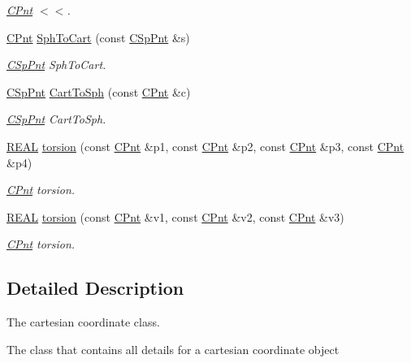 \begin{DoxyCompactItemize}
\begin{DoxyCompactList}\small\item\em \hyperlink{classCPnt}{C\-Pnt} $<$$<$. \end{DoxyCompactList}\item 
\hyperlink{classCPnt}{C\-Pnt} \hyperlink{classCPnt_af8b263bb80bb3a76271a7f57d5057df3}{Sph\-To\-Cart} (const \hyperlink{classCSpPnt}{C\-Sp\-Pnt} \&s)
\begin{DoxyCompactList}\small\item\em \hyperlink{classCSpPnt}{C\-Sp\-Pnt} Sph\-To\-Cart. \end{DoxyCompactList}\item 
\hyperlink{classCSpPnt}{C\-Sp\-Pnt} \hyperlink{classCPnt_ad05fbf75e7550a927bc817f97115f2fc}{Cart\-To\-Sph} (const \hyperlink{classCPnt}{C\-Pnt} \&c)
\begin{DoxyCompactList}\small\item\em \hyperlink{classCSpPnt}{C\-Sp\-Pnt} Cart\-To\-Sph. \end{DoxyCompactList}\item 
\hyperlink{util_8h_a5821460e95a0800cf9f24c38915cbbde}{R\-E\-A\-L} \hyperlink{classCPnt_ac25278586b4a84caf4098513d812d60b}{torsion} (const \hyperlink{classCPnt}{C\-Pnt} \&p1, const \hyperlink{classCPnt}{C\-Pnt} \&p2, const \hyperlink{classCPnt}{C\-Pnt} \&p3, const \hyperlink{classCPnt}{C\-Pnt} \&p4)
\begin{DoxyCompactList}\small\item\em \hyperlink{classCPnt}{C\-Pnt} torsion. \end{DoxyCompactList}\item 
\hyperlink{util_8h_a5821460e95a0800cf9f24c38915cbbde}{R\-E\-A\-L} \hyperlink{classCPnt_a774fe41d28888a078993d8d3384c34d8}{torsion} (const \hyperlink{classCPnt}{C\-Pnt} \&v1, const \hyperlink{classCPnt}{C\-Pnt} \&v2, const \hyperlink{classCPnt}{C\-Pnt} \&v3)
\begin{DoxyCompactList}\small\item\em \hyperlink{classCPnt}{C\-Pnt} torsion. \end{DoxyCompactList}\end{DoxyCompactItemize}


\subsection{Detailed Description}
The cartesian coordinate class. 

The class that contains all details for a cartesian coordinate object 

